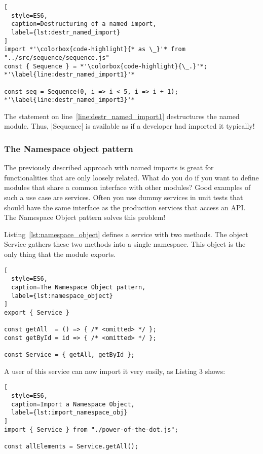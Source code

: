 \begin{lstlisting}[
  style=ES6,
  caption=Destructuring of a named import,
  label={lst:destr_named_import}
]
import *'\colorbox{code-highlight}{* as \_}'* from "../src/sequence/sequence.js" 
const { Sequence } = *'\colorbox{code-highlight}{\_.}'*; *'\label{line:destr_named_import1}'*

const seq = Sequence(0, i => i < 5, i => i + 1); *'\label{line:destr_named_import3}'*
\end{lstlisting}

The statement on line~\ref{line:destr_named_import1} destructures the named
module. Thus, |Sequence| is available as if a developer had imported it
typically!


\subsubsection{The Namespace object pattern} %
\label{sec:The Namespace Object Pattern}
The previously described approach with named imports is great for
functionalities that are only loosely related. What do you do if you want to
define modules that share a common interface with other modules? Good examples
of such a use case are services. Often you use dummy services in unit tests
that should have the same interface as the production services that access an
API. The Namespace Object pattern solves this problem!

Listing~\ref{lst:namespace_object} defines a service with two methods. The
object Service gathers these two methods into a single namespace. This object
is the only thing that the module exports.

\begin{lstlisting}[
  style=ES6,
  caption=The Namespace Object pattern,
  label={lst:namespace_object}
]
export { Service }

const getAll  = () => { /* <omitted> */ };
const getById = id => { /* <omitted> */ };

const Service = { getAll, getById };
\end{lstlisting}

A user of this service can now import it very easily, as Listing 3 shows:

\begin{lstlisting}[
  style=ES6,
  caption=Import a Namespace Object,
  label={lst:import_namespace_obj}
]
import { Service } from "./power-of-the-dot.js";

const allElements = Service.getAll();
\end{lstlisting}

